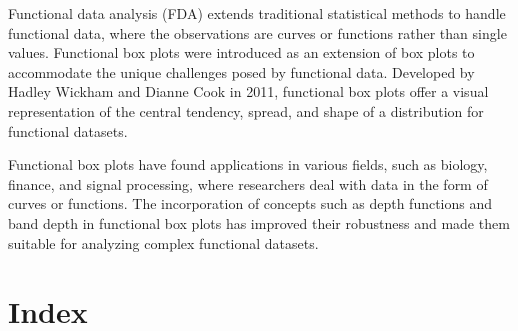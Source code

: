 \documentclass{article}\usepackage[]{graphicx}\usepackage[]{xcolor}
\numberwithin{equation}{section}
\begin{document}
{\noindent Functional data analysis (FDA) extends traditional statistical methods to handle functional data, where the observations are curves or functions rather than single values. Functional box plots were introduced as an extension of box plots to accommodate the unique challenges posed by functional data. Developed by Hadley Wickham and Dianne Cook in 2011, functional box plots offer a visual representation of the central tendency, spread, and shape of a distribution for functional datasets.

\noindent Functional box plots have found applications in various fields, such as biology, finance, and signal processing, where researchers deal with data in the form of curves or functions. The incorporation of concepts such as depth functions and band depth in functional box plots has improved their robustness and made them suitable for analyzing complex functional datasets.


\newpage  

\section{Index}  

}
\end{document}
